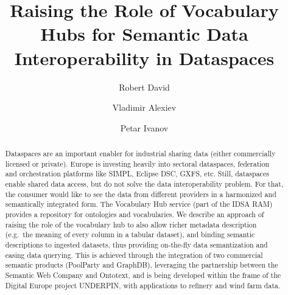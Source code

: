\documentclass[manuscript,screen]{acmart}
\begin{document}
\title{Raising the Role of Vocabulary Hubs for Semantic Data
Interoperability in Dataspaces}



  \author{Robert David}
        \author{Vladimir Alexiev}
    \author{Petar Ivanov}
      

\begin{abstract}
Dataspaces are an important enabler for industrial sharing data (either
commercially licensed or private). Europe is investing heavily into
sectoral dataspaces, federation and orchestration platforms like SIMPL,
Eclipse DSC, GXFS, etc. Still, dataspaces enable shared data access, but
do not solve the data interoperability problem. For that, the consumer
would like to see the data from different providers in a harmonized and
semantically integrated form. The Vocabulary Hub service (part of the
IDSA RAM) provides a repository for ontologies and vocabularies. We
describe an approach of raising the role of the vocabulary hub to also
allow richer metadata description (e.g.~the meaning of every column in a
tabular dataset), and binding semantic descriptions to ingested
datasets, thus providing on-the-fly data semantization and easing data
querying. This is achieved through the integration of two commercial
semantic products (PoolParty and GraphDB), leveraging the partnership
between the Semantic Web Company and Ontotext, and is being developed
within the frame of the Digital Europe project UNDERPIN, with
applications to refinery and wind farm data.    
\end{abstract}
\end{document}
